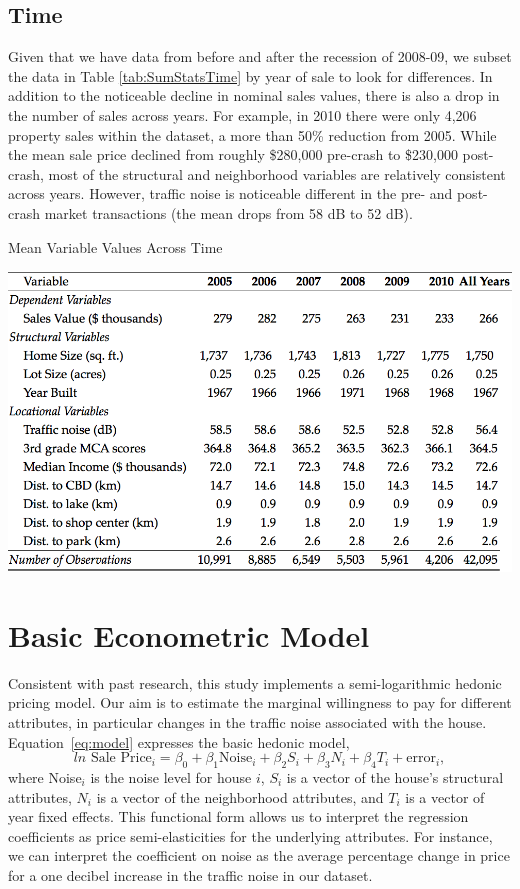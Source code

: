 \documentclass{article}\usepackage{graphicx, color}
\begin{document}
\subsection{Time}
Given that we have data from before and after the recession of 2008-09, we subset the data in Table \ref{tab:SumStatsTime} by year of sale to look for differences. In addition to the noticeable decline in nominal sales values, there is also a drop in the number of sales across years. For example, in 2010 there were only 4,206 property sales within the dataset, a more than 50\% reduction from 2005. While the mean sale price declined from roughly \$280,000 pre-crash to \$230,000 post-crash, most of the structural and neighborhood variables are relatively consistent across years. However, traffic noise is noticeable different in the pre- and post-crash market transactions (the mean drops from 58 dB to 52 dB). 

\begin{table}
\caption{Mean Variable Values Across Time}\label{tab:SumStatsTime}
\includegraphics[width = \textwidth]{../graphs/DescriptiveStatsByYear}
\end{table}

\section{Basic Econometric Model}\label{basicModel}
Consistent with past research, this study implements a semi-logarithmic hedonic pricing model. Our aim is to estimate the marginal willingness to pay for different attributes, in particular changes in the traffic noise associated with the house. Equation~\eqref{eq:model} expresses the basic hedonic model,
\begin{equation}\label{eq:model}	
ln \textrm{ Sale Price}_i = \beta _0 + \beta _1 \textrm{Noise}_i+ \beta _2 S_i+ \beta _3 N_i + \beta _4 T_i + \textrm{error}_i,
\end{equation}
where Noise$_i$ is the noise level for house $i$, $S_i$ is a vector of the house's structural attributes, $N_i$ is a vector of the neighborhood attributes, and $T_i$ is a vector of year fixed effects. This functional form allows us to interpret the regression coefficients as price semi-elasticities for the underlying attributes. For instance, we can interpret the coefficient on noise as the average percentage change in price for a one decibel increase in the traffic noise in our dataset. 
\end{document}
